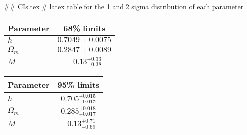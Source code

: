 ## CIs.tex
# latex table for the 1 and 2 sigma distribution of each parameter

\begin{tabular} { l  c}
 Parameter &  68\% limits\\
\hline
{\boldmath$h              $} & $0.7049\pm 0.0075          $\\
{\boldmath$\Omega_m       $} & $0.2847\pm 0.0089          $\\
{\boldmath$M              $} & $-0.13^{+0.33}_{-0.38}     $\\
\hline
\end{tabular}

\begin{tabular} { l  c}
 Parameter &  95\% limits\\
\hline
{\boldmath$h              $} & $0.705^{+0.015}_{-0.015}   $\\
{\boldmath$\Omega_m       $} & $0.285^{+0.018}_{-0.017}   $\\
{\boldmath$M              $} & $-0.13^{+0.71}_{-0.69}     $\\
\hline
\end{tabular}
